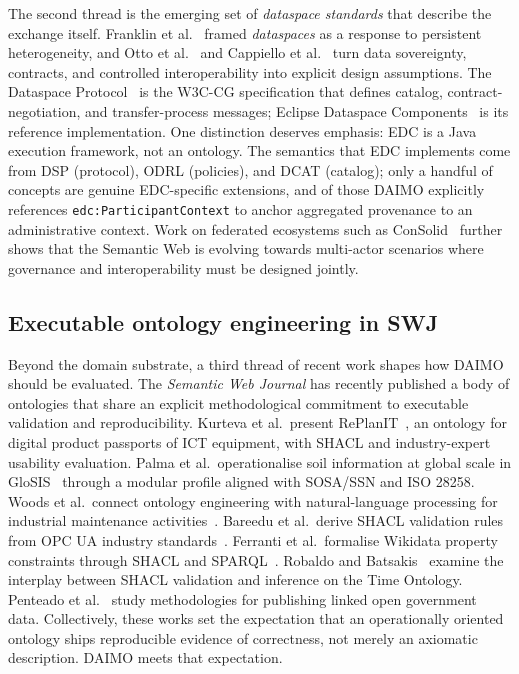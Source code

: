 \documentclass[Afour,sagev,times]{sagej}
\newcommand{\code}[1]{\texttt{#1}}
\begin{document}
The second thread is the emerging set of \emph{dataspace standards} that describe the exchange itself. Franklin et al.~\cite{franklin05} framed \emph{dataspaces} as a response to persistent heterogeneity, and Otto et al.~\cite{otto19} and Cappiello et al.~\cite{cappiello22} turn data sovereignty, contracts, and controlled interoperability into explicit design assumptions. The Dataspace Protocol~\cite{dsp} is the W3C-CG specification that defines catalog, contract-negotiation, and transfer-process messages; Eclipse Dataspace Components~\cite{edc} is its reference implementation. One distinction deserves emphasis: EDC is a Java execution framework, not an ontology. The semantics that EDC implements come from DSP (protocol), ODRL (policies), and DCAT (catalog); only a handful of concepts are genuine EDC-specific extensions, and of those DAIMO explicitly references \code{edc:ParticipantContext} to anchor aggregated provenance to an administrative context. Work on federated ecosystems such as ConSolid~\cite{werbrouck24} further shows that the Semantic Web is evolving towards multi-actor scenarios where governance and interoperability must be designed jointly.

\subsection{Executable ontology engineering in SWJ}

Beyond the domain substrate, a third thread of recent work shapes how DAIMO should be evaluated. The \emph{Semantic Web Journal} has recently published a body of ontologies that share an explicit methodological commitment to executable validation and reproducibility. Kurteva et al.\ present RePlanIT~\cite{kurteva}, an ontology for digital product passports of ICT equipment, with SHACL and industry-expert usability evaluation. Palma et al.\ operationalise soil information at global scale in GloSIS~\cite{palma} through a modular profile aligned with SOSA/SSN and ISO 28258. Woods et al.\ connect ontology engineering with natural-language processing for industrial maintenance activities~\cite{woods}. Bareedu et al.\ derive SHACL validation rules from OPC UA industry standards~\cite{bareedu24}. Ferranti et al.\ formalise Wikidata property constraints through SHACL and SPARQL~\cite{ferranti}. Robaldo and Batsakis~\cite{robaldo} examine the interplay between SHACL validation and inference on the Time Ontology. Penteado et al.~\cite{penteado23} study methodologies for publishing linked open government data. Collectively, these works set the expectation that an operationally oriented ontology ships reproducible evidence of correctness, not merely an axiomatic description. DAIMO meets that expectation.
\end{document}
